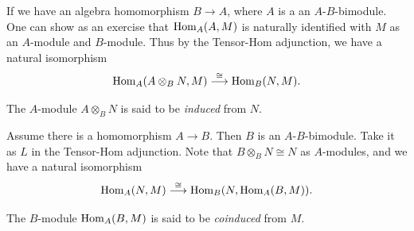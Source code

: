 \begin{example}
  If we have an algebra homomorphism
  $B \to A$, where $A$ is a
  an $A$-$B$-bimodule. One can
  show as an exercise that
  $\operatorname{Hom}_A(A, M)$ is naturally identified
  with $M$ as an $A$-module and $B$-module.
  Thus by the Tensor-Hom adjunction,
  we have a natural isomorphism
  \[
    \operatorname{Hom}_A(A \otimes_B N, M)
    \overset{\cong}{\longrightarrow}
    \operatorname{Hom}_B(N, M).
  \]
\end{example}

\begin{definition}
  The $A$-module $A \otimes_B N$ is
  said to be \emph{induced} from $N$.
\end{definition}

\begin{remark}
  Assume there is
  a homomorphism $A \to B$. Then $B$
  is an $A$-$B$-bimodule. Take it as $L$
  in the Tensor-Hom adjunction.
  Note that $B \otimes_B N \cong N$
  as $A$-modules, and we have a natural
  isomorphism
  \[
    \operatorname{Hom}_A(N, M)
    \overset{\cong}{\longrightarrow}
    \operatorname{Hom}_B(N, \operatorname{Hom}_A(B, M)).
  \]
\end{remark}

\begin{definition}
  The $B$-module $\operatorname{Hom}_A(B, M)$ is
  said to be \emph{coinduced} from $M$.
\end{definition}
